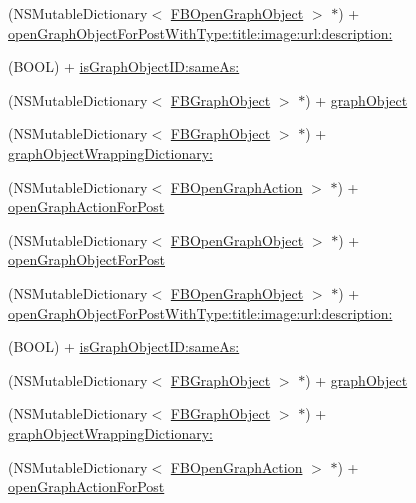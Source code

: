 \begin{DoxyCompactItemize}
\item 
(N\+S\+Mutable\+Dictionary$<$ \hyperlink{protocolFBOpenGraphObject-p}{F\+B\+Open\+Graph\+Object} $>$ $\ast$) + \hyperlink{interfaceFBGraphObject_ad8c6af9938313eafd419342903a15f25}{open\+Graph\+Object\+For\+Post\+With\+Type\+:title\+:image\+:url\+:description\+:}
\item 
(B\+O\+OL) + \hyperlink{interfaceFBGraphObject_a62b9fd3318de27294b10860c9a62160c}{is\+Graph\+Object\+I\+D\+:same\+As\+:}
\item 
(N\+S\+Mutable\+Dictionary$<$ \hyperlink{interfaceFBGraphObject}{F\+B\+Graph\+Object} $>$ $\ast$) + \hyperlink{interfaceFBGraphObject_af260be1d9411288632bf883f84838853}{graph\+Object}
\item 
(N\+S\+Mutable\+Dictionary$<$ \hyperlink{interfaceFBGraphObject}{F\+B\+Graph\+Object} $>$ $\ast$) + \hyperlink{interfaceFBGraphObject_af840ca586bf7b7ecf55d97c0e780f2cd}{graph\+Object\+Wrapping\+Dictionary\+:}
\item 
(N\+S\+Mutable\+Dictionary$<$ \hyperlink{protocolFBOpenGraphAction-p}{F\+B\+Open\+Graph\+Action} $>$ $\ast$) + \hyperlink{interfaceFBGraphObject_a88f02cdbd7bbafe3c836b9bcd731860d}{open\+Graph\+Action\+For\+Post}
\item 
(N\+S\+Mutable\+Dictionary$<$ \hyperlink{protocolFBOpenGraphObject-p}{F\+B\+Open\+Graph\+Object} $>$ $\ast$) + \hyperlink{interfaceFBGraphObject_a79fab85a97be10dc0d5bf6febcc848f4}{open\+Graph\+Object\+For\+Post}
\item 
(N\+S\+Mutable\+Dictionary$<$ \hyperlink{protocolFBOpenGraphObject-p}{F\+B\+Open\+Graph\+Object} $>$ $\ast$) + \hyperlink{interfaceFBGraphObject_ad8c6af9938313eafd419342903a15f25}{open\+Graph\+Object\+For\+Post\+With\+Type\+:title\+:image\+:url\+:description\+:}
\item 
(B\+O\+OL) + \hyperlink{interfaceFBGraphObject_a62b9fd3318de27294b10860c9a62160c}{is\+Graph\+Object\+I\+D\+:same\+As\+:}
\item 
(N\+S\+Mutable\+Dictionary$<$ \hyperlink{interfaceFBGraphObject}{F\+B\+Graph\+Object} $>$ $\ast$) + \hyperlink{interfaceFBGraphObject_af260be1d9411288632bf883f84838853}{graph\+Object}
\item 
(N\+S\+Mutable\+Dictionary$<$ \hyperlink{interfaceFBGraphObject}{F\+B\+Graph\+Object} $>$ $\ast$) + \hyperlink{interfaceFBGraphObject_af840ca586bf7b7ecf55d97c0e780f2cd}{graph\+Object\+Wrapping\+Dictionary\+:}
\item 
(N\+S\+Mutable\+Dictionary$<$ \hyperlink{protocolFBOpenGraphAction-p}{F\+B\+Open\+Graph\+Action} $>$ $\ast$) + \hyperlink{interfaceFBGraphObject_a88f02cdbd7bbafe3c836b9bcd731860d}{open\+Graph\+Action\+For\+Post}

\end{DoxyCompactItemize}
